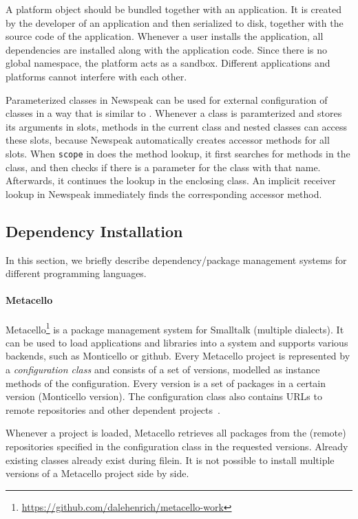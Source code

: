 A platform object should be bundled together with an application. It is created by the developer of an application and then serialized to disk, together with the source code of the application. Whenever a user installs the application, all dependencies are installed along with the application code. Since there is no global namespace, the platform acts as a sandbox. Different applications and platforms cannot interfere with each other.

Parameterized classes in Newspeak can be used for external configuration of classes in a way that is similar to \msname. Whenever a class is paramterized and stores its arguments in slots, methods in the current class and nested classes can access these slots, because Newspeak automatically creates accessor methods for all slots. When \texttt{scope} in \msname does the method lookup, it first searches for methods in the class, and then checks if there is a parameter for the class with that name. Afterwards, it continues the lookup in the enclosing class. An implicit receiver lookup in Newspeak immediately finds the corresponding accessor method.

\subsection{Dependency Installation}
\label{sec:rel_metacello}
In this section, we briefly describe dependency/package management systems for different programming languages.

\paragraph{Metacello}
Metacello\footnote{\url{https://github.com/dalehenrich/metacello-work}} is a package management system for Smalltalk (multiple dialects). It can be used to load applications and libraries into a system and supports various backends, such as Monticello or github. Every Metacello project is represented by a \emph{configuration class} and consists of a set of versions, modelled as instance methods of the configuration. Every version is a set of packages in a certain version (Monticello version). The configuration class also contains URLs to remote repositories and other dependent projects~\cite{metacellodraft}.

Whenever a project is loaded, Metacello retrieves all packages from the (remote) repositories specified in the configuration class in the requested versions. Already existing classes already exist during filein. It is not possible to install multiple versions of a Metacello project side by side.

